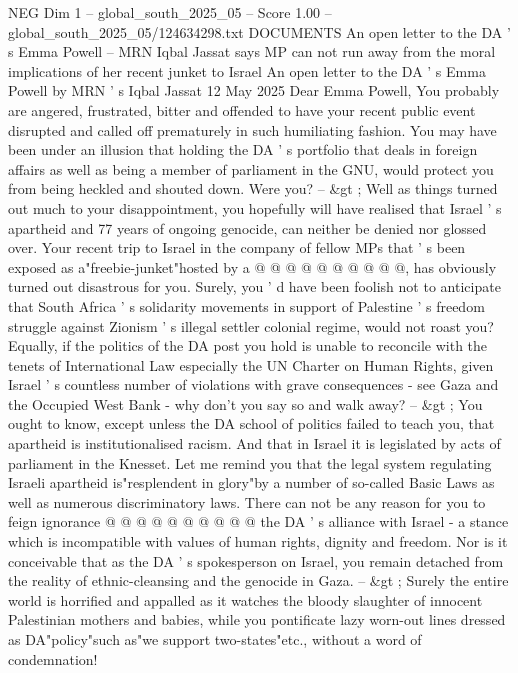 \begin{textsample}{NEG Dim 1 – global\_south\_2025\_05 – Score 1.00 – global\_south\_2025\_05/124634298.txt}  \label{ex:f1_neg_387}
DOCUMENTS An open letter to the DA ' s Emma Powell -- MRN Iqbal Jassat says MP can not run away from the moral implications of her recent junket to Israel An open letter to the DA ' s Emma Powell by MRN ' s Iqbal Jassat 12 May 2025 Dear Emma Powell, You probably are angered, frustrated, bitter and offended to have your recent public event disrupted and called off prematurely in such humiliating fashion.
You may have been under an illusion that holding the DA ' s portfolio that deals in foreign affairs as well as being a member of parliament in the GNU, would protect you from being heckled and shouted down.
Were you? -- \&gt ; Well as things turned out much to your disappointment, you hopefully will have realised that Israel ' s apartheid and 77 years of ongoing genocide, can neither be denied nor glossed over.
Your recent trip to Israel in the company of fellow MPs that ' s been exposed as a"freebie-junket"hosted by a @ @ @ @ @ @ @ @ @ @, has obviously turned out disastrous for you.
Surely, you ' d have been foolish not to anticipate that South Africa ' s solidarity movements in support of Palestine ' s freedom struggle against Zionism ' s illegal settler colonial regime, would not roast you?
Equally, if the politics of the DA post you hold is unable to reconcile with the tenets of International Law especially the UN Charter on Human Rights, given Israel ' s countless number of violations with grave consequences - see Gaza and the Occupied West Bank - why don't you say so and walk away? -- \&gt ; You ought to know, except unless the DA school of politics failed to teach you, that apartheid is institutionalised racism.
And that in Israel it is legislated by acts of parliament in the Knesset.
Let me remind you that the legal system regulating Israeli apartheid is"resplendent in glory"by a number of so-called Basic Laws as well as numerous discriminatory laws.
There can not be any reason for you to feign ignorance @ @ @ @ @ @ @ @ @ @ the DA ' s alliance with Israel - a stance which is incompatible with values of human rights, dignity and freedom.
Nor is it conceivable that as the DA ' s spokesperson on Israel, you remain detached from the reality of ethnic-cleansing and the genocide in Gaza. -- \&gt ; Surely the entire world is horrified and appalled as it watches the bloody slaughter of innocent Palestinian mothers and babies, while you pontificate lazy worn-out lines dressed as DA"policy"such as"we support two-states"etc., without a word of condemnation!

\end{textsample}
